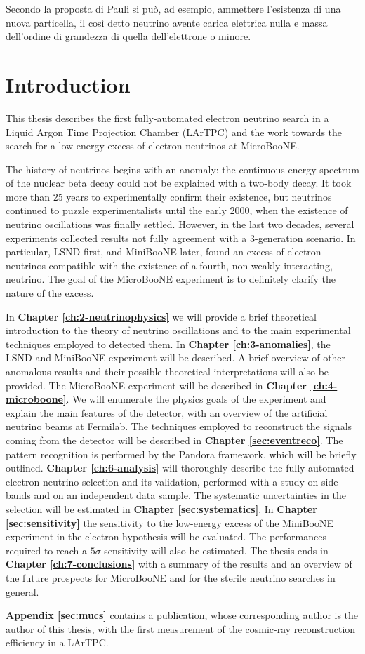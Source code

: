 \begin{savequote}[8cm]
 Secondo la proposta di Pauli si può, ad esempio, ammettere l'esistenza di una nuova particella, il così detto neutrino avente carica elettrica nulla e massa dell'ordine di grandezza di quella dell'elettrone o minore.
\end{savequote}

\chapter{\label{ch:1-intro}Introduction} 

This thesis describes the first fully-automated electron neutrino search in a Liquid Argon Time Projection Chamber (LArTPC) and the work towards the search for a low-energy excess of electron neutrinos at MicroBooNE.

The history of neutrinos begins with an anomaly: the continuous energy spectrum of the nuclear beta decay could not be explained with a two-body decay. It took more than 25 years to experimentally confirm their existence, but neutrinos continued to puzzle experimentalists until the early 2000, when the existence of neutrino oscillations was finally settled. 
However, in the last two decades, several experiments collected results not fully agreement with a 3-generation scenario.
In particular, LSND first, and MiniBooNE later, found an excess of electron neutrinos compatible with the existence of a fourth, non weakly-interacting, neutrino. The goal of the MicroBooNE experiment is to definitely clarify the nature of the excess.

In \textbf{Chapter \ref{ch:2-neutrinophysics}} we will provide a brief theoretical introduction to the theory of neutrino oscillations and to the main experimental techniques employed to detected them.
In \textbf{Chapter \ref{ch:3-anomalies}}, the LSND and MiniBooNE experiment will be described. A brief overview of other anomalous results and their possible theoretical interpretations will also be provided.
The MicroBooNE experiment will be described in \textbf{Chapter \ref{ch:4-microboone}}. We will enumerate the physics goals of the experiment and explain the main features of the detector, with an overview of the artificial neutrino beams at Fermilab.
The techniques employed to reconstruct the signals coming from the detector will be described in \textbf{Chapter \ref{sec:eventreco}}. The pattern recognition is performed by the Pandora framework, which will be briefly outlined.
\textbf{Chapter \ref{ch:6-analysis}} will thoroughly describe the fully automated electron-neutrino selection and its validation, performed with a study on side-bands and on an independent data sample. The systematic uncertainties in the selection will be estimated in \textbf{Chapter \ref{sec:systematics}}.
In \textbf{Chapter \ref{sec:sensitivity}} the sensitivity to the low-energy excess of the MiniBooNE experiment in the electron hypothesis will be evaluated. The performances required to reach a $5\sigma$ sensitivity will also be estimated.
The thesis ends in \textbf{Chapter \ref{ch:7-conclusions}} with a summary of the results and an overview of the future prospects for MicroBooNE and for the sterile neutrino searches in general. 

\vspace{1em}

\textbf{Appendix \ref{sec:mucs}} contains a publication, whose corresponding author is the author of this thesis, with the first measurement of the cosmic-ray reconstruction efficiency in a LArTPC.